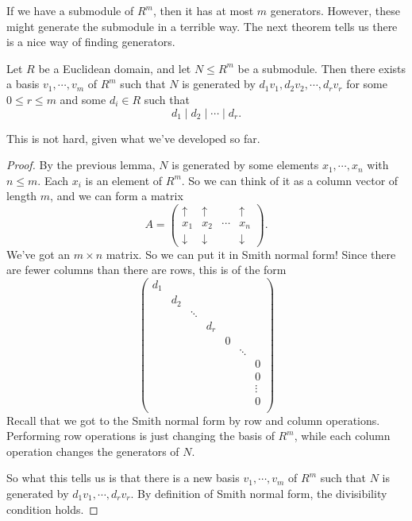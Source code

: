 \documentclass[a4paper]{article}
\begin{document}
If we have a submodule of $R^m$, then it has at most $m$ generators. However, these might generate the submodule in a terrible way. The next theorem tells us there is a nice way of finding generators.
\begin{thm}
  Let $R$ be a Euclidean domain, and let $N \leq R^m$ be a submodule. Then there exists a basis $v_1, \cdots, v_m$ of $R^m$ such that $N$ is generated by $d_1 v_1, d_2 v_2, \cdots, d_r v_r$ for some $0 \leq r \leq m$ and some $d_i \in R$ such that
  \[
    d_1 \mid d_2 \mid \cdots \mid d_r.
  \]
\end{thm}

This is not hard, given what we've developed so far.
\begin{proof}
  By the previous lemma, $N$ is generated by some elements $x_1, \cdots, x_n$ with $n \leq m$. Each $x_i$ is an element of $R^m$. So we can think of it as a column vector of length $m$, and we can form a matrix
  \[
    A =
    \begin{pmatrix}
      \uparrow & \uparrow & & \uparrow\\
      x_1 & x_2 & \cdots & x_n\\
      \downarrow & \downarrow & & \downarrow
    \end{pmatrix}.
  \]
  We've got an $m \times n$ matrix. So we can put it in Smith normal form! Since there are fewer columns than there are rows, this is of the form
  \[
    \begin{pmatrix}
      d_1\\
      & d_2\\
      & & \ddots\\
      & & & d_r\\
      & & & & 0\\
      & & & & & \ddots\\
      & & & & & & 0\\
      & & & & & & 0\\
      & & & & & & \vdots\\
      & & & & & & 0\\
    \end{pmatrix}
  \]
  Recall that we got to the Smith normal form by row and column operations. Performing row operations is just changing the basis of $R^m$, while each column operation changes the generators of $N$.

  So what this tells us is that there is a new basis $v_1, \cdots, v_m$ of $R^m$ such that $N$ is generated by $d_1 v_1, \cdots, d_r v_r$. By definition of Smith normal form, the divisibility condition holds.
\end{proof}
\end{document}
